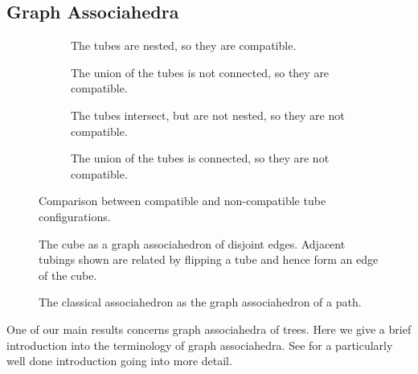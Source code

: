 \documentclass[fontsize=11pt,a4paper,DIV=12]{scrartcl}
\begin{document}
\subsection{Graph Associahedra}

\begin{figure}[!ht]
    \centering
    \begin{subfigure}{0.24\textwidth}
        \centering
        
        \caption{The tubes are nested, so they are compatible.}
        \label{fig:compat_1}
    \end{subfigure}%
    \hfill
    \begin{subfigure}{0.24\textwidth}
        \centering
        
        \caption{The union of the tubes is not connected, so they are compatible.}
        \label{fig:compat_2}
    \end{subfigure}%
    \hfill
    \begin{subfigure}{0.24\textwidth}
        \centering
        
        \caption{The tubes intersect, but are not nested, so they are not compatible.}
        \label{fig:not_compat_1}
    \end{subfigure}%
    \hfill
    \begin{subfigure}{0.24\textwidth}
        \centering
        
        \caption{The union of the tubes is connected, so they are not compatible.}
        \label{fig:not_compat_2}
    \end{subfigure}
    
    \caption{Comparison between compatible and non-compatible tube configurations.}
    \label{fig:tubes_comparison}
\end{figure}

\begin{figure}
    \centering
    
    \caption{The cube as a graph associahedron of disjoint edges. Adjacent tubings shown are related by flipping a tube and hence form an edge of the cube.}
    \label{fig:cube_graph_asso}
\end{figure}

\begin{figure}
    \centering
    
    \caption{The classical associahedron as the graph associahedron of a path.}
    \label{fig:classical_asso_as_graph_asso}
\end{figure}

One of our main results concerns graph associahedra of trees. Here we give a brief introduction into the terminology of graph associahedra. See \cite{celebrating_associahedron} for a particularly well done introduction going into more detail.
\end{document}
